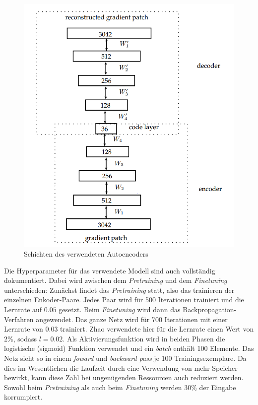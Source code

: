 \begin{figure}
	\centering
	\includegraphics[scale=0.6]{images/ae_model.png}
	\caption{Schichten des verwendeten Autoencoders \cite{aed2016}}
	\label{img:ae_model}
\end{figure}

Die Hyperparameter für das verwendete Modell sind auch vollständig dokumentiert. Dabei wird zwischen dem \textit{Pretraining} und dem \textit{Finetuning} unterschieden: Zunächst findet das \textit{Pretraining} statt, also das trainieren der einzelnen Enkoder-Paare. Jedes Paar wird für 500 Iterationen trainiert und die Lernrate auf $0.05$ gesetzt. Beim \textit{Finetuning} wird dann das Backpropagation-Verfahren angewendet. Das ganze Netz wird für 700 Iterationen mit einer Lernrate von $0.03$ trainiert. Zhao verwendete hier für die Lernrate einen Wert von $2\%$, sodass $l = 0.02$. Als Aktivierungsfunktion wird in beiden Phasen die logistische (sigmoid) Funktion verwendet und ein \textit{batch} enthält 100 Elemente. Das Netz sieht so in einem \textit{foward} und \textit{backward pass} je 100 Trainingsexemplare. Da dies im Wesentlichen die Laufzeit durch eine Verwendung von mehr Speicher bewirkt, kann diese Zahl bei ungenügenden Ressourcen auch reduziert werden. Sowohl beim \textit{Pretraining} als auch beim \textit{Finetuning} werden 30\% der Eingabe korrumpiert.

